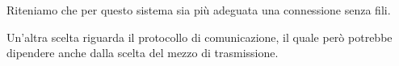 Riteniamo che per questo sistema sia pi\`u adeguata una connessione senza fili. 

Un'altra scelta riguarda il protocollo di comunicazione, il quale per\`o potrebbe dipendere anche dalla scelta del mezzo di trasmissione.

% 
% 
% 
% 
% 
% 
% 
% 
% 
% 
